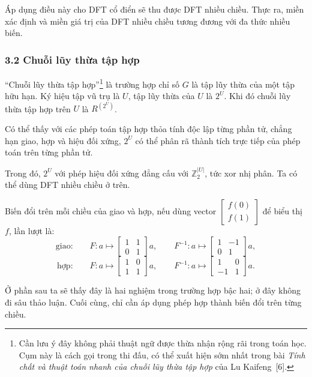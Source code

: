 \documentclass[11pt]{article}
\begin{document}
Áp dụng điều này cho DFT cổ điển sẽ thu được DFT nhiều chiều. Thực ra, miền xác
định và miền giá trị của DFT nhiều chiều tương đương với đa thức nhiều biến.

\subsubsection*{3.2 Chuỗi lũy thừa tập hợp}

``Chuỗi lũy thừa tập hợp''\footnote{Cần lưu ý đây không phải thuật ngữ được
thừa nhận rộng rãi trong toán học. Cụm này là cách gọi trong thi đấu, có thể
xuất hiện sớm nhất trong bài \emph{Tính chất và thuật toán nhanh của chuỗi lũy
thừa tập hợp} của Lu Kaifeng~[6].} là trường hợp chỉ số \(G\) là tập lũy thừa
của một tập hữu hạn. Ký hiệu tập vũ trụ là \(U\), tập lũy thừa của \(U\) là
\(2^U\). Khi đó chuỗi lũy thừa tập hợp trên \(U\) là \(R^{(2^U)}\).

Có thể thấy với các phép toán tập hợp thỏa tính độc lập từng phần tử, chẳng hạn
giao, hợp và hiệu đối xứng, \(2^U\) có thể phân rã thành tích trực tiếp của phép
toán trên từng phần tử.

Trong đó, \(2^U\) với phép hiệu đối xứng đẳng cấu với \(\mathbb Z_2^{|U|}\), tức
xor nhị phân. Ta có thể dùng DFT nhiều chiều ở trên.

Biến đổi trên mỗi chiều của giao và hợp, nếu dùng vector
\(\begin{bmatrix}f(0)\\f(1)\end{bmatrix}\) để biểu thị \(f\), lần lượt là:
\[
  \text{giao:}\qquad
  F:a\mapsto
  \begin{bmatrix}1&1\\0&1\end{bmatrix}a,\qquad
  F^{-1}:a\mapsto
  \begin{bmatrix}1&-1\\0&1\end{bmatrix}a,
\]
\[
  \text{hợp:}\qquad
  F:a\mapsto
  \begin{bmatrix}1&0\\1&1\end{bmatrix}a,\qquad
  F^{-1}:a\mapsto
  \begin{bmatrix}1&0\\-1&1\end{bmatrix}a.
\]

Ở phần sau ta sẽ thấy đây là hai nghiệm trong trường hợp bậc hai; ở đây không
đi sâu thảo luận. Cuối cùng, chỉ cần áp dụng phép hợp thành biến đổi trên từng
chiều.
\end{document}
